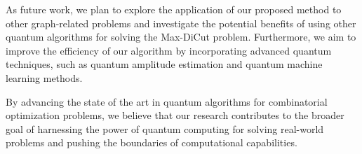As future work, we plan to explore the application of our proposed method to other graph-related problems and investigate the potential benefits of using other quantum algorithms for solving the Max-DiCut problem. Furthermore, we aim to improve the efficiency of our algorithm by incorporating advanced quantum techniques, such as quantum amplitude estimation and quantum machine learning methods.

By advancing the state of the art in quantum algorithms for combinatorial optimization problems, we believe that our research contributes to the broader goal of harnessing the power of quantum computing for solving real-world problems and pushing the boundaries of computational capabilities.


